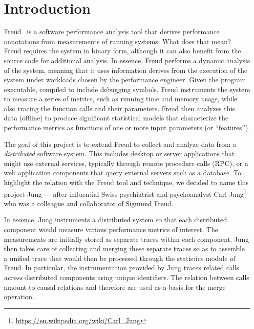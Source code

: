 \documentclass[11pt,english,singlespacing,headsepline,consistentlayout]{auxiliary/si-msc-thesis}
\begin{document}
%


\tableofcontents 


\mainmatter
 
\pagestyle{thesis} 

%

\chapter{Introduction}

Freud~\cite{freud} is a software performance analysis tool that
derives performance annotations from measurements of running
systems. What does that mean?  Freud requires the system in binary
form, although it can also benefit from the source code for additional
analysis.  In essence, Freud performs a dynamic analysis of the
system, meaning that it uses information derives from the execution of
the system under workloads chosen by the performance engineer.  Given
the program executable, compiled to include debugging symbols, Freud
instruments the system to measure a series of metrics, such as running
time and memory usage, while also tracing the function calls and their
parameters. Freud then analyzes this data (offline) to produce
significant statistical models that characterize the performance
metrics as functions of one or more input parameters (or
``features'').

The goal of this project is to extend Freud to collect and analyze
data from a \emph{distributed} software system.  This includes desktop
or server applications that might use external services, typically
through remote procedure calls (RPC), or a web application components
that query external servers such as a database.  To highlight the
relation with the Freud tool and technique, we decided to name this
project Jung --- after influential Swiss psychiatrist and psychoanalyst
Carl Jung\footnote{\url{https://en.wikipedia.org/wiki/Carl_Jung}} who
was a colleague and collaborator of Sigmund Freud.

In essence, Jung instruments a distributed system so that each
distributed component would measure various performance metrics of
interest.  The measurements are initially stored as separate traces
within each component.  Jung then takes care of collecting and merging
these separate traces so as to assemble a unified trace that would
then be processed through the statistics module of Freud.  In
particular, the instrumentation provided by Jung traces related calls
\emph{across} distributed components using unique identifiers.  The 
relation between calls amount to causal relations and therefore are
used as a basis for the merge operation.
\end{document}
